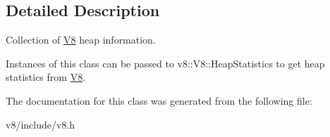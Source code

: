\subsection{Detailed Description}
Collection of \hyperlink{classv8_1_1V8}{V8} heap information.

Instances of this class can be passed to v8\-::\-V8\-::\-Heap\-Statistics to get heap statistics from \hyperlink{classv8_1_1V8}{V8}. 

The documentation for this class was generated from the following file\-:\begin{DoxyCompactItemize}
\item 
v8/include/v8.\-h\end{DoxyCompactItemize}
